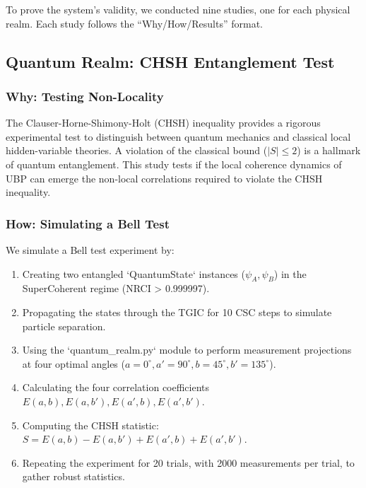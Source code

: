 \documentclass[12pt, a4paper]{article}
\begin{document}
To prove the system's validity, we conducted nine studies, one for each physical realm. Each study follows the ``Why/How/Results'' format.

\subsection{Quantum Realm: CHSH Entanglement Test}

\subsubsection{Why: Testing Non-Locality}
The Clauser-Horne-Shimony-Holt (CHSH) inequality provides a rigorous experimental test to distinguish between quantum mechanics and classical local hidden-variable theories. A violation of the classical bound ($|S| \leq 2$) is a hallmark of quantum entanglement. This study tests if the local coherence dynamics of UBP can emerge the non-local correlations required to violate the CHSH inequality.

\subsubsection{How: Simulating a Bell Test}
We simulate a Bell test experiment by:
\begin{enumerate}
    \item Creating two entangled `QuantumState` instances ($\psi_A, \psi_B$) in the SuperCoherent regime (NRCI > 0.999997).
    \item Propagating the states through the TGIC for 10 CSC steps to simulate particle separation.
    \item Using the `quantum\_realm.py` module to perform measurement projections at four optimal angles ($a=0^\circ, a'=90^\circ, b=45^\circ, b'=135^\circ$).
    \item Calculating the four correlation coefficients $E(a,b), E(a,b'), E(a',b), E(a',b')$.
    \item Computing the CHSH statistic: $S = E(a,b) - E(a,b') + E(a',b) + E(a',b')$.
    \item Repeating the experiment for 20 trials, with 2000 measurements per trial, to gather robust statistics.
\end{enumerate}
\end{document}
